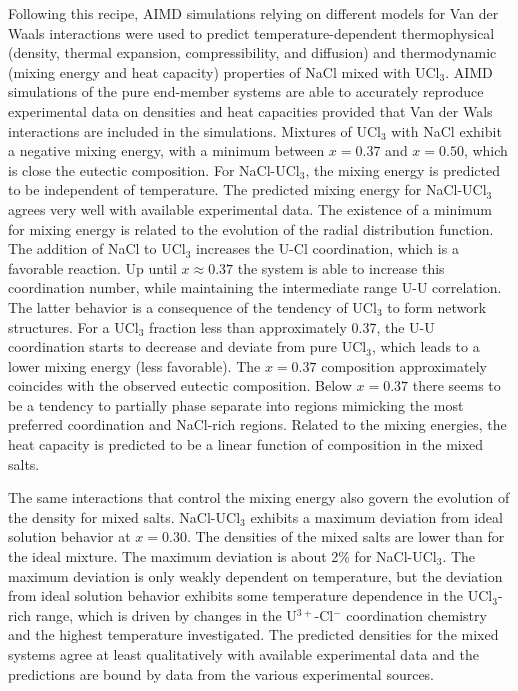 \documentclass[preprint,3p,10pt,onecolumn,number,sort&compress]{elsarticle}
\begin{document}
{Following this recipe, AIMD simulations relying on different models for Van der Waals interactions were used to predict temperature-dependent thermophysical (density, thermal expansion, compressibility, and diffusion) and thermodynamic (mixing energy and heat capacity) properties of NaCl mixed with UCl$_3$. AIMD simulations of the pure end-member systems are able to accurately reproduce experimental data on densities and heat capacities provided that Van der Wals interactions are included in the simulations. %
Mixtures of UCl$_3$ with NaCl exhibit a negative mixing energy, with a minimum between $x=0.37$ and $x=0.50$, which is close the eutectic composition. 
For NaCl-UCl$_3$, the mixing energy is predicted to be independent of temperature. The predicted mixing energy for NaCl-UCl$_3$ agrees very well with available experimental data. 
The existence of a minimum for mixing energy is related to the evolution of the radial distribution function. The addition of NaCl to UCl$_3$ increases the U-Cl coordination, which is a favorable reaction. Up until $x\approx0.37$ the system is able to increase this coordination number, while maintaining the intermediate range U-U correlation. The latter behavior is a consequence of the tendency of UCl$_3$ to form network structures. For a UCl$_3$ fraction less than approximately 0.37, the U-U coordination starts to decrease and deviate from pure UCl$_3$, which leads to a lower mixing energy (less favorable). The $x=0.37$ composition approximately coincides with the observed eutectic composition. Below $x=0.37$ there seems to be a tendency to partially phase separate into regions mimicking the most preferred coordination and NaCl-rich regions. Related to the mixing energies, the heat capacity is predicted to be a linear function of composition in the mixed salts.

The same interactions that control the mixing energy also govern the evolution of the density for mixed salts. NaCl-UCl$_3$ exhibits a maximum deviation from ideal solution behavior at $x=0.30$. The densities of the mixed salts are lower than for the ideal mixture. The maximum deviation is about 2\% for NaCl-UCl$_3$. The maximum deviation is only weakly dependent on temperature, but the deviation from ideal solution behavior exhibits some temperature dependence in the UCl$_3$-rich range, which is driven by changes in the U$^{3+}$-Cl$^{-}$ coordination chemistry and the highest temperature investigated.
 The predicted densities for the mixed systems agree at least qualitatively with available experimental data and the predictions are bound by data from the various experimental sources. 

}
\end{document}
